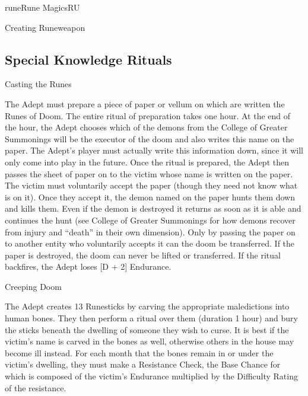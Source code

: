 \begin{college}[1.1]{rune}{Rune Magics}{RU}
\begin{spell}[S-8]{Creating Runeweapon}
\begin{effects}
\end{effects}
\end{spell}

\subsection{Special Knowledge Rituals}

\begin{ritual}[R-1]{Casting the Runes}

\begin{effects}
The Adept must prepare a piece of paper or vellum on which are written
the Runes of Doom. The entire ritual of preparation takes one hour. At
the end of the hour, the Adept chooses which of the demons from the
College of Greater Summonings will be the executor of the doom and
also writes this name on the paper.  The Adept's player must actually
write this information down, since it will only come into play in the
future.  Once the ritual is prepared, the Adept then passes the sheet
of paper on to the victim whose name is written on the paper.  The
victim must voluntarily accept the paper (though they need not know
what is on it).  Once they accept it, the demon named on the paper
hunts them down and kills them. Even if the demon is destroyed it
returns as soon as it is able and continues the hunt (see College of
Greater Summonings for how demons recover from injury and ``death'' in
their own dimension).  Only by passing the paper on to another entity
who voluntarily accepts it can the doom be transferred.  If the paper
is destroyed, the doom can never be lifted or transferred.  If the
ritual backfires, the Adept loses [D + 2] Endurance.
\end{effects}
\end{ritual}

\begin{ritual}[R-2]{Creeping Doom}

\begin{effects}
The Adept creates 13 Runesticks by carving the appropriate
maledictions into human bones.  They then perform a ritual over them
(duration 1 hour) and bury the sticks beneath the dwelling of
someone they wish to curse. It is best if the victim's name is carved
in the bones as well, otherwise others in the house may become ill
instead. For each month that the bones remain in or under the victim's
dwelling, they must make a Resistance Check, the Base Chance for which
is composed of the victim's Endurance multiplied by the Difficulty
Rating of the resistance.


\end{effects}
\end{ritual}
\end{college}
